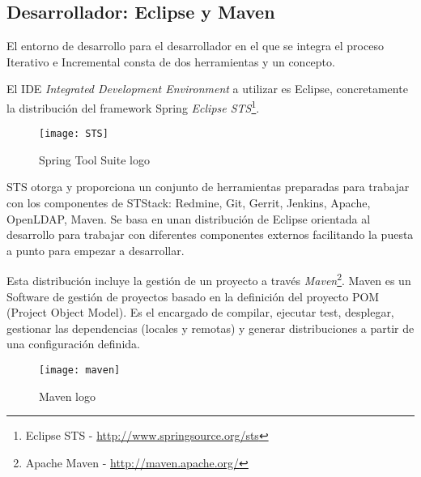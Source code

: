 



\subsection{Desarrollador: Eclipse y Maven}
\label{sub:eclipse-mvn-tdd}

\par El entorno de desarrollo para el desarrollador en el que se integra el proceso Iterativo e Incremental consta de dos herramientas y un concepto.

\par El IDE \emph{Integrated Development Environment} a utilizar es Eclipse, concretamente la distribución del framework Spring \emph{Eclipse STS}\footnote{Eclipse STS - \url{http://www.springsource.org/sts}}. 

\begin{figure}[H]
    \centering
    \texttt{[image: STS]}
    \caption{Spring Tool Suite logo}
    \label{fig:sts}
\end{figure}

\par STS otorga y proporciona un conjunto de herramientas preparadas para trabajar con los componentes de STStack: Redmine, Git, Gerrit, Jenkins, Apache, OpenLDAP, Maven. Se basa en unan distribución de Eclipse orientada al desarrollo para trabajar con diferentes componentes externos facilitando la puesta a punto para empezar a desarrollar.

\par Esta distribución incluye la gestión de un proyecto a través \emph{Maven}\footnote{Apache Maven - \url{http://maven.apache.org/}}. Maven es un Software de gestión de proyectos basado en la definición del proyecto POM (Project Object Model). Es el encargado de compilar, ejecutar test, desplegar, gestionar las dependencias (locales y remotas) y generar distribuciones a partir de una configuración definida.

\begin{figure}[H]
    \centering
    \texttt{[image: maven]}
    \caption{Maven logo}
    \label{fig:maven-logo}
\end{figure}


